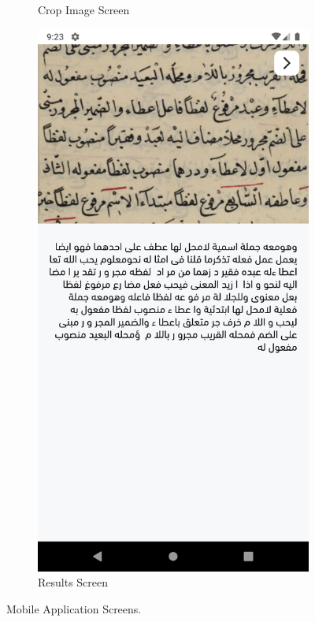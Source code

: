 \begin{figure}[H]
\begin{subfigure}[b]{0.3\textwidth}
         \caption{Crop Image Screen}
         \label{fig:mobile-crop-image}
     \end{subfigure}
     \hspace{1cm}
      \begin{subfigure}[b]{0.3\textwidth}
         \centering
         \includegraphics[width=\textwidth]{images/app/mobile/mobile-5.png}
         \caption{Results Screen}
         \label{fig:mobile-results-screen}
     \end{subfigure}
    \caption{Mobile Application Screens.}
    \label{fig:mobile-app-screens}
\end{figure}
